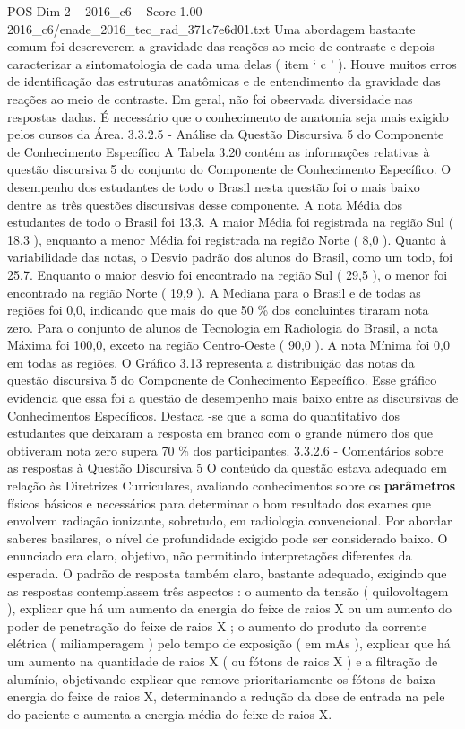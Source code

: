 \begin{textsample}{POS Dim 2 – 2016\_c6 – Score 1.00 – 2016\_c6/enade\_2016\_tec\_rad\_371c7e6d01.txt}
Uma abordagem bastante comum foi descreverem a gravidade das reações ao meio de contraste e depois caracterizar a sintomatologia de cada uma delas ( item ‘ c ’ ).
Houve muitos erros de identificação das estruturas anatômicas e de entendimento da gravidade das reações ao meio de contraste.
Em geral, não foi observada diversidade nas respostas dadas.
É necessário que o conhecimento de anatomia seja mais exigido pelos cursos da Área. 3.3.2.5 - Análise da Questão Discursiva 5 do Componente de Conhecimento Específico A Tabela 3.20 contém as informações relativas à questão discursiva 5 do conjunto do Componente de Conhecimento Específico.
O desempenho dos estudantes de todo o Brasil nesta questão foi o mais baixo dentre as três questões discursivas desse componente.
A nota Média dos estudantes de todo o Brasil foi 13,3.
A maior Média foi registrada na região Sul ( 18,3 ), enquanto a menor Média foi registrada na região Norte ( 8,0 ).
Quanto à variabilidade das notas, o Desvio padrão dos alunos do Brasil, como um todo, foi 25,7.
Enquanto o maior desvio foi encontrado na região Sul ( 29,5 ), o menor foi encontrado na região Norte ( 19,9 ).
A Mediana para o Brasil e de todas as regiões foi 0,0, indicando que mais do que 50 \% dos concluintes tiraram nota zero.
Para o conjunto de alunos de Tecnologia em Radiologia do Brasil, a nota Máxima foi 100,0, exceto na região Centro-Oeste ( 90,0 ).
A nota Mínima foi 0,0 em todas as regiões.
O Gráfico 3.13 representa a distribuição das notas da questão discursiva 5 do Componente de Conhecimento Específico.
Esse gráfico evidencia que essa foi a questão de desempenho mais baixo entre as discursivas de Conhecimentos Específicos.
Destaca -se que a soma do quantitativo dos estudantes que deixaram a resposta em branco com o grande número dos que obtiveram nota zero supera 70 \% dos participantes. 3.3.2.6 - Comentários sobre as respostas à Questão Discursiva 5 O conteúdo da questão estava adequado em relação às Diretrizes Curriculares, avaliando conhecimentos sobre os \textbf{parâmetros} físicos básicos e necessários para determinar o bom resultado dos exames que envolvem radiação ionizante, sobretudo, em radiologia convencional.
Por abordar saberes basilares, o nível de profundidade exigido pode ser considerado baixo.
O enunciado era claro, objetivo, não permitindo interpretações diferentes da esperada.
O padrão de resposta também claro, bastante adequado, exigindo que as respostas contemplassem três aspectos : o aumento da tensão ( quilovoltagem ), explicar que há um aumento da energia do feixe de raios X ou um aumento do poder de penetração do feixe de raios X ; o aumento do produto da corrente elétrica ( miliamperagem ) pelo tempo de exposição ( em mAs ), explicar que há um aumento na quantidade de raios X ( ou fótons de raios X ) e a filtração de alumínio, objetivando explicar que remove prioritariamente os fótons de baixa energia do feixe de raios X, determinando a redução da dose de entrada na pele do paciente e aumenta a energia média do feixe de raios X.

\end{textsample}
